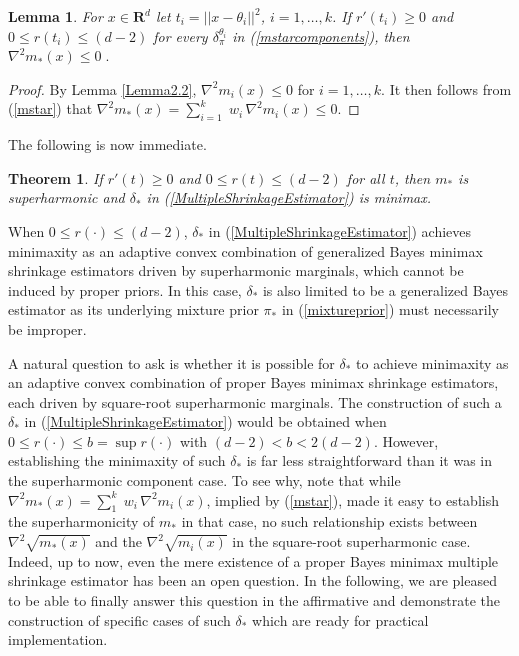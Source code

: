 \documentclass[11pt]{article}
\newtheorem{theorem}{Theorem}
\newtheorem{lemma}{Lemma}
\theoremstyle{definition}
\begin{document}
\begin{lemma} \label{Lemma3.1}
For $x \in \mathbf{R}^d$ let $t_i = ||x - \theta_i||^2$, $i = 1,\ldots,k$.   If $r'(t_i) \geq 0$ and $0 \leq r(t_i) \leq (d - 2)$ for every $\delta_\pi^{\theta_i}$ in (\ref{mstarcomponents}), then $\nabla^2 m_*(x) \leq 0\;.$
\end{lemma}
\begin{proof}
By Lemma \ref{Lemma2.2}, $\nabla^2 m_i (x) \leq 0$ for $i = 1,\ldots,k$.  It then follows from (\ref{mstar}) that $\nabla^2 m_*(x) = \sum_{i = 1}^k \;w_i\,\nabla^2 m_i(x) \leq 0$.
\end{proof}

The following is now immediate.
\begin{theorem}
    If $r'(t) \ge 0$ and $0 \leq r(t) \leq (d-2)$ for all $t$, then $m_*$ is superharmonic and $\delta_*$ in (\ref{MultipleShrinkageEstimator}) is minimax.
\end{theorem}

When $0 \leq r(\cdot) \leq (d-2)$, $\delta_*$ in (\ref{MultipleShrinkageEstimator}) achieves minimaxity as an adaptive convex combination of generalized Bayes minimax shrinkage estimators driven by superharmonic marginals, which cannot be induced by proper priors.  In this case,  $\delta_*$ is also limited to be a generalized Bayes estimator as its underlying mixture prior $\pi_{*}$ in (\ref{mixtureprior}) must necessarily be improper.  

A natural question to ask is whether it is possible for $\delta_*$ to achieve minimaxity as an adaptive convex combination of proper Bayes minimax shrinkage estimators, each driven by square-root superharmonic marginals.  The construction of such a $\delta_*$ in (\ref{MultipleShrinkageEstimator}) would be obtained when $0 \leq r(\cdot) \leq b = \sup r(\cdot)$ with $(d - 2) < b < 2(d - 2)$. However, establishing the minimaxity of such $\delta_*$ is far less straightforward than it was in the superharmonic component case.  To see why, note that while $\nabla^2 m_*(x) =\sum_1^k\;w_i\,\nabla^2 m_i(x)$, implied by (\ref{mstar}), made it easy to establish the superharmonicity of $m_*$ in that case, no such relationship exists between $\nabla^2\sqrt{m_*(x)}$ and the $\nabla^2\sqrt{m_i(x)}$ in the square-root superharmonic case. Indeed, up to now, even the mere existence of a proper Bayes minimax multiple shrinkage estimator has been an open question.  In the following, we are pleased to be able to finally answer this question in the affirmative and demonstrate the construction of specific cases of such $\delta_*$ which are ready for practical implementation.  \\ 
\end{document}
